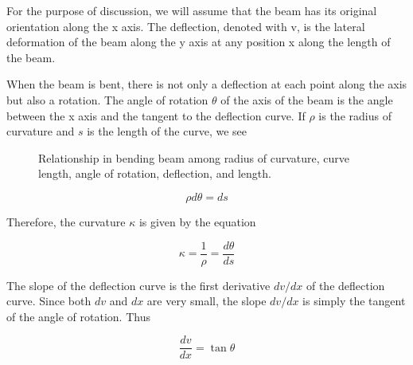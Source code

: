 \documentclass[
10pt,
a4paper,
openany,
svgnames,
]{book}
\begin{document}
For the purpose of discussion, we will assume that the beam has its original orientation along the x axis. The deflection, denoted with v, is the lateral deformation of the beam along the y axis at any position x along the length of the beam.

When the beam is bent, there is not only a deflection at each point along the axis but also a rotation. The angle of rotation $\theta$ of the axis of the beam is the angle between the x axis and the tangent to the deflection curve. If $\rho$ is the radius of curvature and $s$ is the length of the curve, we see

\begin{figure}[h]
  \centering
  \caption{Relationship in bending beam among radius of curvature, curve length, angle of rotation, deflection, and length.}
\end{figure}

\[ \rho d\theta  = ds \]

Therefore, the curvature $\kappa$ is given by the equation

\begin{equation} \label{eqn: deflection curve}
  \kappa  = \frac{1}{\rho } = \frac{d\theta }{ds}
\end{equation}

The slope of the deflection curve is the first derivative $dv/dx$ of the deflection curve. Since both $dv$ and $dx$ are very small, the slope $dv/dx$ is simply the tangent of the angle of rotation. Thus

\begin{equation} \label{eqn: tan approx}
  \frac{dv}{dx} = \tan \theta
\end{equation}
\end{document}
